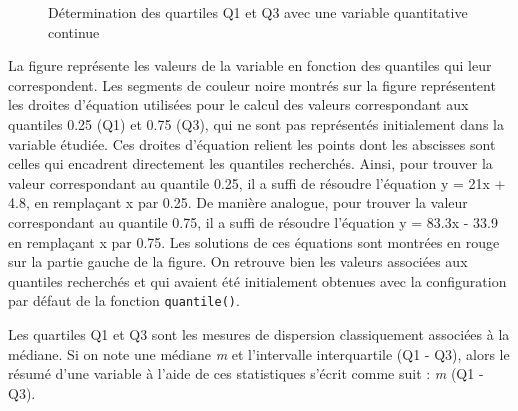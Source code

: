 \documentclass[
  letterpaper,
]{book}
\begin{document}
\begin{figure}


\caption{\label{fig-graphicContinuouQuantiles}Détermination des
quartiles Q1 et Q3 avec une variable quantitative continue}

\end{figure}%

La figure représente les valeurs de la variable en fonction des
quantiles qui leur correspondent. Les segments de couleur noire montrés
sur la figure représentent les droites d'équation utilisées pour le
calcul des valeurs correspondant aux quantiles 0.25 (Q1) et 0.75 (Q3),
qui ne sont pas représentés initialement dans la variable étudiée. Ces
droites d'équation relient les points dont les abscisses sont celles qui
encadrent directement les quantiles recherchés. Ainsi, pour trouver la
valeur correspondant au quantile 0.25, il a suffi de résoudre l'équation
y = 21x + 4.8, en remplaçant x par 0.25. De manière analogue, pour
trouver la valeur correspondant au quantile 0.75, il a suffi de résoudre
l'équation y = 83.3x - 33.9 en remplaçant x par 0.75. Les solutions de
ces équations sont montrées en rouge sur la partie gauche de la figure.
On retrouve bien les valeurs associées aux quantiles recherchés et qui
avaient été initialement obtenues avec la configuration par défaut de la
fonction \texttt{quantile()}.

Les quartiles Q1 et Q3 sont les mesures de dispersion classiquement
associées à la médiane. Si on note une médiane \emph{m} et l'intervalle
interquartile (Q1 - Q3), alors le résumé d'une variable à l'aide de ces
statistiques s'écrit comme suit : \emph{m} (Q1 - Q3).
\end{document}
